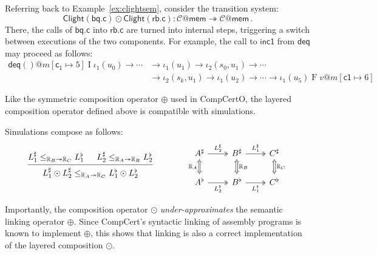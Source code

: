 \documentclass[acmsmall,screen,review,anonymous]{acmart}
\newcommand{\kw}[1]{\ensuremath{ \mathsf{#1} }}
\begin{document}
\begin{example}
Referring back to Example~\ref{ex:clightsem},
consider the transition system:
\[
  \kw{Clight}(\kw{bq.c}) \odot \kw{Clight}(\kw{rb.c}) :
  \mathcal{C}@\kw{mem} \twoheadrightarrow \mathcal{C}@\kw{mem}
  \,.
\]
There,
the calls of $\kw{bq.c}$ into $\kw{rb.c}$
are turned into internal steps,
triggering a switch between executions of the two components.
For example,
the call to $\kw{inc1}$ from $\kw{deq}$
may proceed as follows:
\begin{align*}
  \kw{deq}()@m[\kw{c_1} \mapsto 5] \mathrel{I} \iota_1(u_0)
  \rightarrow \cdots &\rightarrow \iota_1(u_1)
  \rightarrow \iota_2(s_0, u_1)
  \rightarrow \cdots \\ &\rightarrow \iota_2(s_k, u_1)
  \rightarrow \iota_1(u_2) \rightarrow \cdots
  \rightarrow \iota_1(u_5) \mathrel{F} v@m[\kw{c1} \mapsto 6]
\end{align*}
\end{example}

Like the symmetric composition operator $\oplus$ used in CompCertO,
the layered composition operator defined above
is compatible with simulations.

\begin{theorem} \label{thm:lcompsim}
Simulations compose as follows:
\[
  \begin{prooftree}
    \hypo{L_1^\sharp
          \le_{\mathbb{R}_B \twoheadrightarrow \mathbb{R}_C}
          L_1^\flat}
    \hypo{L_2^\sharp
          \le_{\mathbb{R}_A \twoheadrightarrow \mathbb{R}_B}
          L_2^\flat}
    \infer2{L_1^\sharp \odot L_2^\sharp
          \le_{\mathbb{R}_A \twoheadrightarrow \mathbb{R}_C}
          L_1^\flat \odot L_2^\flat}
  \end{prooftree}
  \qquad \qquad
  \begin{tikzcd}
    A^\sharp \ar[r, twoheadrightarrow, "L_2^\sharp"]
             \ar[d, Leftrightarrow, "\mathbb{R}_A"'] &
    B^\sharp \ar[r, twoheadrightarrow, "L_1^\sharp"]
             \ar[d, Leftrightarrow, "\mathbb{R}_B"] &
    C^\sharp \ar[d, Leftrightarrow, "\mathbb{R}_C"]
    \\
    A^\flat \ar[r, twoheadrightarrow, "L_2^\flat"'] &
    B^\flat \ar[r, twoheadrightarrow, "L_1^\flat"'] &
    C^\flat
  \end{tikzcd}
\]
\end{theorem}

Importantly,
the composition operator $\odot$
\emph{under-approximates}
the semantic linking operator $\oplus$.
Since CompCert's syntactic linking of assembly programs
is known to implement $\oplus$,
this shows that linking is also a correct implementation of
the layered composition $\odot$.
\end{document}

